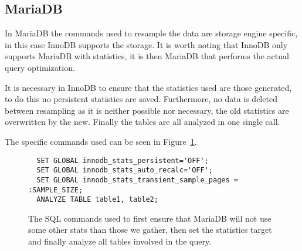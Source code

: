 \subsection{MariaDB}\label{sec:mariadb}
In MariaDB the commands used to resample the data are storage engine specific,
in this case InnoDB supports the storage. It is worth noting that InnoDB only
supports MariaDB with statistics, it is then MariaDB that performs the actual
query optimization.

It is necessary in InnoDB to ensure that the statistics used are those
generated, to do this no persistent statistics are saved. Furthermore, no data
is deleted between resampling as it is neither possible nor necessary, the old
statistics are overwritten by the new. Finally the tables are all analyzed in
one single  call.

The specific commands used can be seen in Figure~\ref{fig:sql:resamplemdb}.

\begin{figure}[ht]
\begin{verbatim}
  SET GLOBAL innodb_stats_persistent='OFF';
  SET GLOBAL innodb_stats_auto_recalc='OFF';
  SET GLOBAL innodb_stats_transient_sample_pages = :SAMPLE_SIZE;
  ANALYZE TABLE table1, table2;
\end{verbatim}
\caption[The SQL commands used to resample in MariaDB.]{The SQL commands used to
first ensure that MariaDB will not use some other stats than those we gather,
then set the statistics target and finally analyze all tables involved in the query.}
\label{fig:sql:resamplemdb}
\end{figure}